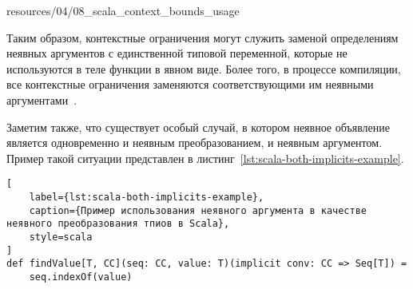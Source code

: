 
{resources/04/08_scala_context_bounds_usage}

Таким образом, контекстные ограничения могут служить заменой определениям неявных аргументов с единственной типовой переменной, которые не используются в теле функции в явном виде. Более того, в процессе компиляции, все контекстные ограничения заменяются соответствующими им неявными аргументами~\cite{context-bounds}.  

Заметим также, что существует особый случай, в котором неявное объявление является одновременно и неявным преобразованием, и неявным аргументом. Пример такой ситуации представлен в листинг~\ref{lst:scala-both-implicits-example}. 

\begin{lstlisting}[
    label={lst:scala-both-implicits-example},
    caption={Пример использования неявного аргумента в качестве неявного преобразования тпиов в Scala},
    style=scala
]
def findValue[T, CC](seq: CC, value: T)(implicit conv: CC => Seq[T]) = 
    seq.indexOf(value)
\end{lstlisting}

